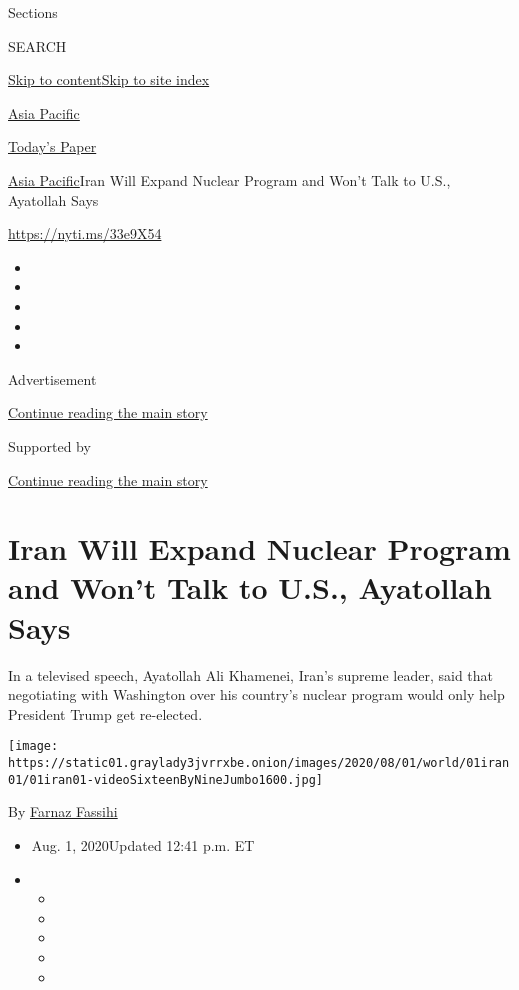 Sections

SEARCH

\protect\hyperlink{site-content}{Skip to
content}\protect\hyperlink{site-index}{Skip to site index}

\href{https://www.nytimes3xbfgragh.onion/section/world/asia}{Asia
Pacific}

\href{https://myaccount.nytimes3xbfgragh.onion/auth/login?response_type=cookie\&client_id=vi}{}

\href{https://www.nytimes3xbfgragh.onion/section/todayspaper}{Today's
Paper}

\href{/section/world/asia}{Asia Pacific}\textbar{}Iran Will Expand
Nuclear Program and Won't Talk to U.S., Ayatollah Says

\url{https://nyti.ms/33e9X54}

\begin{itemize}
\item
\item
\item
\item
\item
\end{itemize}

Advertisement

\protect\hyperlink{after-top}{Continue reading the main story}

Supported by

\protect\hyperlink{after-sponsor}{Continue reading the main story}

\hypertarget{iran-will-expand-nuclear-program-and-wont-talk-to-us-ayatollah-says}{%
\section{Iran Will Expand Nuclear Program and Won't Talk to U.S.,
Ayatollah
Says}\label{iran-will-expand-nuclear-program-and-wont-talk-to-us-ayatollah-says}}

In a televised speech, Ayatollah Ali Khamenei, Iran's supreme leader,
said that negotiating with Washington over his country's nuclear program
would only help President Trump get re-elected.

\texttt{[image: https://static01.graylady3jvrrxbe.onion/images/2020/08/01/world/01iran01/01iran01-videoSixteenByNineJumbo1600.jpg]}

By \href{https://www.nytimes3xbfgragh.onion/by/farnaz-fassihi}{Farnaz
Fassihi}

\begin{itemize}
\item
  Aug. 1, 2020Updated 12:41 p.m. ET
\item
  \begin{itemize}
  \item
  \item
  \item
  \item
  \item
  \end{itemize}
\end{itemize}

